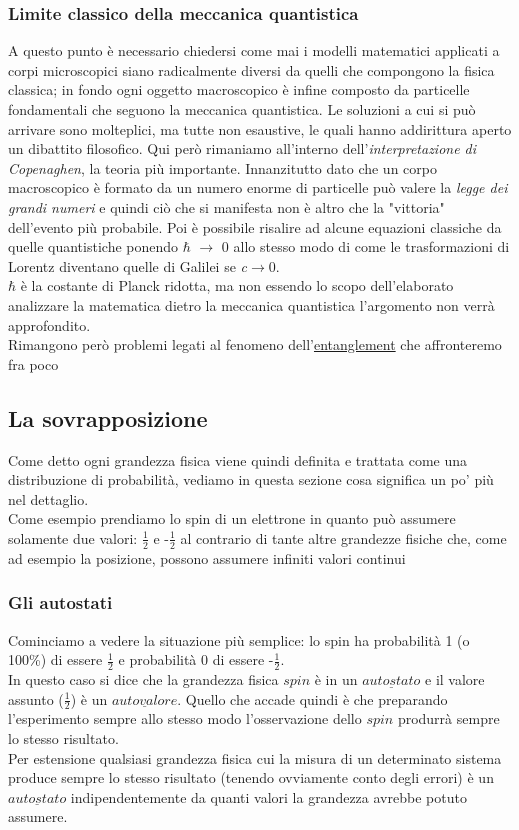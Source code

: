 \subsubsection{Limite classico della meccanica quantistica}
A questo punto è necessario chiedersi come mai i modelli matematici applicati a corpi microscopici siano radicalmente diversi da quelli che compongono la fisica classica; in fondo ogni oggetto macroscopico è infine composto da particelle fondamentali che seguono la meccanica quantistica.
Le soluzioni a cui si può arrivare sono molteplici, ma tutte non esaustive, le quali hanno addirittura aperto un dibattito filosofico. Qui però rimaniamo all'interno dell'\textit{interpretazione di Copenaghen}, la teoria più importante. Innanzitutto dato che un corpo macroscopico è formato da un numero enorme di particelle può valere la \textit{legge dei grandi numeri} e quindi ciò che si manifesta non è altro che la "vittoria" dell'evento più probabile. Poi è possibile risalire ad alcune equazioni classiche da quelle quantistiche ponendo $\hbar$ $\to$ 0 allo stesso modo di come le trasformazioni di Lorentz diventano quelle di Galilei se \textit{c}$\to 0$.\\
$\hbar$ è la costante di Planck ridotta, ma non essendo lo scopo dell'elaborato analizzare la matematica dietro la meccanica quantistica l'argomento non verrà approfondito.\\
Rimangono però problemi legati al fenomeno dell'\hyperref[sec:entanglement]{entanglement} che affronteremo fra poco
\subsection{La sovrapposizione}
Come detto ogni grandezza fisica viene quindi definita e trattata come una distribuzione di probabilità, vediamo in questa sezione cosa significa un po' più nel dettaglio.\\
Come esempio prendiamo lo spin di un elettrone in quanto può assumere solamente due valori: $\frac{1}{2}$ e -$\frac{1}{2}$ al contrario di tante altre grandezze fisiche che, come ad esempio la posizione, possono assumere infiniti valori continui
\subsubsection{Gli autostati}
Cominciamo a vedere la situazione più semplice: lo spin ha probabilità 1 (o 100\%) di essere $\frac{1}{2}$ e probabilità 0 di essere -$\frac{1}{2}$.\\
In questo caso si dice che la grandezza fisica $\textit{spin}$ è in un $\underline{autostato}$ e il valore assunto ($\frac{1}{2}$) è un $\underline{autovalore}$. Quello che accade quindi è che preparando l'esperimento sempre allo stesso modo l'osservazione dello $\textit{spin}$ produrrà sempre lo stesso risultato.\\
Per estensione qualsiasi grandezza fisica cui la misura di un determinato sistema produce sempre lo stesso risultato (tenendo ovviamente conto degli errori) è un $\underline{autostato}$ indipendentemente da quanti valori la grandezza avrebbe potuto assumere.
